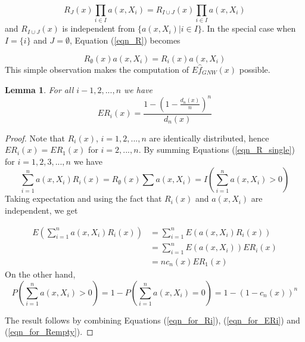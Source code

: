 \documentclass{article}
\newtheorem{lemma}[theorem]{Lemma}
\begin{document}
\begin{equation}
\label{eqn_R}
R_J(x)\prod_{i\in I}a(x,X_i)=R_{I\cup J}(x)\prod_{i\in I}a(x,X_i)
\end{equation}
and $R_{I\cup J}(x)$ is independent from $\{a(x,X_i)|i\in I\}$. In the special case when $I=\{i\}$ and $J=\emptyset$, Equation (\ref{eqn_R}) becomes  

\begin{equation}
\label{eqn_R_single}
R_{\emptyset}(x)a(x,X_i)=R_{i}(x)a(x,X_i)
\end{equation}
This simple observation makes the computation of $E\hat{f}_{GNW}(x)$  possible.
\begin{lemma}
\label{lemma_exp}
For all $i-1,2,...,n$ we have
\begin{equation*}
    ER_i(x)=\frac{1-(1-\frac{d_n(x)}{n})^n}{d_n(x)}
\end{equation*}
\end{lemma}
\begin{proof}
Note that $R_i(x)$, $i=1,2,...,n$ are identically distributed, hence  $ER_i(x)=ER_1(x)$ for $i=2,...,n$.
By summing Equations (\ref{eqn_R_single}) for $i=1,2,3,...,n$ we have 
\begin{equation}
\label{eqn_for_Ri}
    \sum_{i=1}^n a(x,X_i)R_i(x)=R_{\emptyset}(x)\sum a(x,X_i)=I(\sum_{i=1}^n a(x,X_i)>0)
\end{equation}
Taking expectation and using the fact that $R_i(x)$ and $a(x,X_i)$ are independent, we get

\begin{equation}
\label{eqn_for_ERi}
\begin{split}
    E(\sum_{i=1}^n a(x,X_i)R_i(x))&=\sum_{i=1}^n E(a(x,X_i)R_i(x))\\
    &=\sum_{i=1}^n E(a(x,X_i))ER_i(x)\\
    &=nc_n(x)ER_1(x)
\end{split}
\end{equation}
On the other hand,
\begin{equation}
\label{eqn_for_Rempty}
    P(\sum_{i=1}^n a(x,X_i)>0)=1-P(\sum_{i=1}^n a(x,X_i)=0)=1-(1-c_n(x))^n
\end{equation}

The result follows by combining Equations (\ref{eqn_for_Ri}), (\ref{eqn_for_ERi}) and (\ref{eqn_for_Rempty}).

\end{proof}
\end{document}
